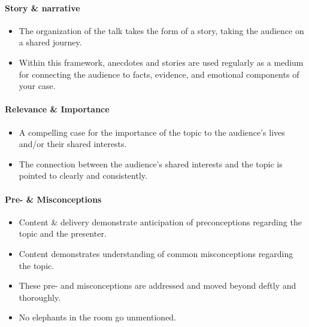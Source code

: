 \documentclass[
]{book}
\providecommand{\tightlist}{%
  \setlength{\itemsep}{0pt}\setlength{\parskip}{0pt}}
\begin{document}
\hypertarget{story-narrative}{%
\paragraph{Story \& narrative}\label{story-narrative}}

\begin{itemize}
\tightlist
\item
  The organization of the talk takes the form of a story, taking the audience on a shared journey.\\
\item
  Within this framework, anecdotes and stories are used regularly as a medium for connecting the
  audience to facts, evidence, and emotional components of your case.
\end{itemize}

\hypertarget{relevance-importance}{%
\paragraph{Relevance \& Importance}\label{relevance-importance}}

\begin{itemize}
\tightlist
\item
  A compelling case for the importance of the topic to the audience's lives and/or their shared interests.\\
\item
  The connection between the audience's shared interests and the topic is pointed to clearly and consistently.
\end{itemize}

\hypertarget{pre--misconceptions}{%
\paragraph{Pre- \& Misconceptions}\label{pre--misconceptions}}

\begin{itemize}
\tightlist
\item
  Content \& delivery demonstrate anticipation of preconceptions regarding the topic and the presenter.\\
\item
  Content demonstrates understanding of common misconceptions regarding the topic.\\
\item
  These pre- and misconceptions are addressed and moved beyond deftly and thoroughly.\\
\item
  No elephants in the room go unmentioned.
\end{itemize}
\end{document}
